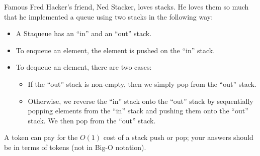 \clearpage
{}

Famous Fred Hacker's friend, Ned Stacker, loves stacks. He loves them
so much that he implemented a queue using two stacks in the following
way:
\begin{itemize}
\item A Staqueue has an ``in'' and an ``out'' stack.
\item To enqueue an element, the element is pushed on the ``in'' stack.
\item To dequeue an element, there are two cases:
  \begin{itemize}
  \item If the ``out'' stack is non-empty, then we simply pop from the
    ``out'' stack.
  \item Otherwise, we reverse the ``in'' stack onto the ``out'' stack
    by sequentially popping elements from the ``in'' stack and pushing
    them onto the ``out'' stack. We then pop from the ``out'' stack.
  \end{itemize}
\end{itemize}

A token can pay for the $O(1)$ cost of a stack push or pop; your
answers should be in terms of tokens (not in Big-O notation).

